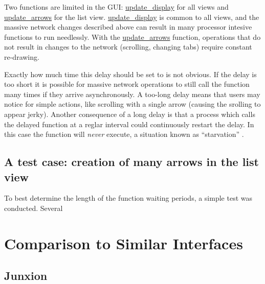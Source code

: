 Two functions are limited in the GUI: \url{update_display} for all views and \url{update_arrows} for the list view. \url{update_display} is common to all views, and the massive network changes described above can result in many processor intesive functions to run needlessly. With the \url{update_arrows} function, operations that do not result in changes to the network (scrolling, changing tabs) require constant re-drawing.

Exactly how much time this delay should be set to is not obvious. If the delay is too short it is possible for massive network operations to still call the function many times if they arrive asynchronously. A too-long delay means that users may notice for simple actions, like scrolling with a single arrow (causing the srolling to appear jerky). Another consequence of a long delay is that a process which calls the delayed function at a reglar interval could continuously restart the delay. In this case the function will \emph{never} execute, a situation known as ``starvation'' .
	

	\subsection{A test case: creation of many arrows in the list view} %
	\label{sub:test_case}

To best determine the length of the function waiting periods, a simple test was conducted. Several



\section{Comparison to Similar Interfaces} %
\label{sec:comparison_to_similar_interfaces}

	\subsection{Junxion} %
	\label{sub:junxion}
		\cite{junxion}

